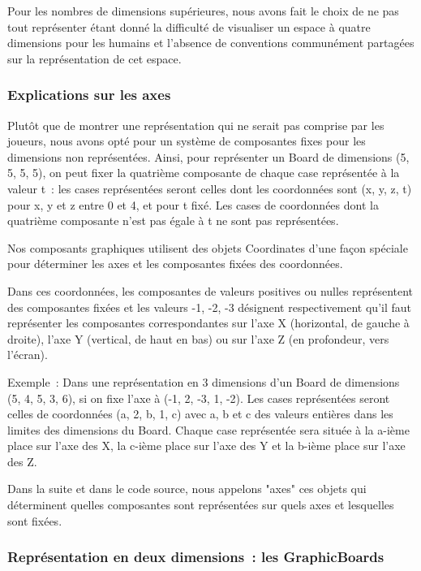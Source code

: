 	Pour les nombres de dimensions supérieures, nous avons fait le choix de ne pas tout représenter étant donné la difficulté de visualiser un espace à quatre dimensions pour les humains et l'absence de conventions communément partagées sur la représentation de cet espace.

\subsubsection{Explications sur les axes}

	Plutôt que de montrer une représentation qui ne serait pas comprise par les joueurs, nous avons opté pour un système de composantes fixes pour les dimensions non représentées. Ainsi, pour représenter un Board de dimensions (5, 5, 5, 5), on peut fixer la quatrième composante de chaque case représentée à la valeur t~: les cases représentées seront celles dont les coordonnées sont (x, y, z, t) pour x, y et z entre 0 et 4, et pour t fixé. Les cases de coordonnées dont la quatrième composante n'est pas égale à t ne sont pas représentées.
\newline

	Nos composants graphiques utilisent des objets Coordinates d'une façon spéciale pour déterminer les axes et les composantes fixées des coordonnées.
	\newline	
	
	Dans ces coordonnées, les composantes de valeurs positives ou nulles représentent des composantes fixées et les valeurs -1, -2, -3 désignent respectivement qu'il faut représenter les composantes correspondantes sur l'axe X (horizontal, de gauche à droite), l'axe Y (vertical, de haut en bas) ou sur l'axe Z (en profondeur, vers l'écran).
\newline
	
	Exemple~: Dans une représentation en 3 dimensions d'un Board de dimensions (5, 4, 5, 3, 6), si on fixe l'axe à (-1, 2, -3, 1, -2). Les cases représentées seront celles de coordonnées (a, 2, b, 1, c) avec a, b et c des valeurs entières dans les limites des dimensions du Board.
Chaque case représentée sera située à la a-ième place sur l'axe des X, la c-ième place sur l'axe des Y et la b-ième place sur l'axe des Z.
\newline

	Dans la suite et dans le code source, nous appelons "axes" ces objets qui déterminent quelles composantes sont représentées sur quels axes et lesquelles sont fixées.

\subsubsection{Représentation en deux dimensions~: les GraphicBoards}


